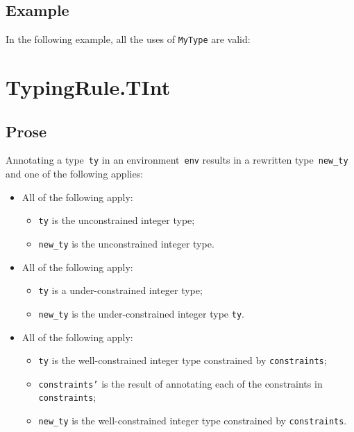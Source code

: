 \documentclass{book}
\begin{document}
\begin{itemize}
\subsection{Example}
In the following example, all the uses of \texttt{MyType} are valid:






\section{TypingRule.TInt \label{sec:TypingRule.TInt}}

\subsection{Prose}
Annotating a type~\texttt{ty} in an environment~\texttt{env} results in a
rewritten type~\texttt{new\_ty} and one of the following applies:
\begin{itemize}
  \item All of the following apply:
    \begin{itemize}
      \item \texttt{ty} is the unconstrained integer type;
      \item \texttt{new\_ty} is the unconstrained integer type.
    \end{itemize}
  \item All of the following apply:
    \begin{itemize}
      \item \texttt{ty} is a under-constrained integer type;
      \item \texttt{new\_ty} is the under-constrained integer type \texttt{ty}.
    \end{itemize}
  \item All of the following apply:
    \begin{itemize}
      \item \texttt{ty} is the well-constrained integer type constrained by
        \texttt{constraints};
      \item \texttt{constraints'} is the result of annotating each of the
        constraints in \texttt{constraints};
      \item \texttt{new\_ty} is the well-constrained integer type constrained
        by \texttt{constraints}.
    \end{itemize}
\end{itemize}


\end{itemize}
\end{document}
